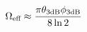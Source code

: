 \documentclass[preview]{standalone}
\begin{document}
\begin{align*}
\special{dvisvgm:raw <g id='unique000'>}\Omega_{\text{eff}} \approx \frac{\pi \theta_{\text{3dB}} \phi_{\text{3dB}} }{8 \ln 2}\special{dvisvgm:raw </g>}
\end{align*}
\end{document}
